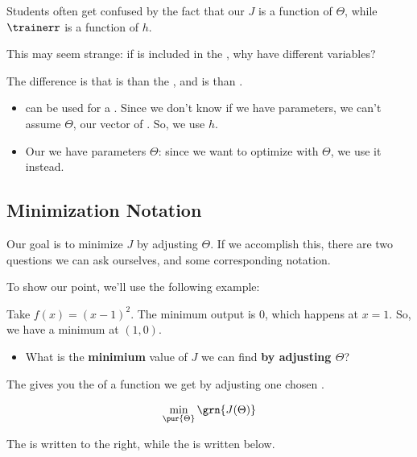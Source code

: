         \begin{clarification}
           Students often get confused by the fact that our  $J$ is a function of $\Theta$, while  $\trainerr$ is a function of $h$.
            
            This may seem strange: if  is included in the , why have different variables?
            
            The difference is that  is  than the , and  is  than \purp{$\Theta$}.
            
            \begin{itemize}
                \item {} can be used for a . Since we don't know if we have parameters, we can't assume $\Theta$, our vector of . So, we use $h$.
                
                \item Our   we have parameters $\Theta$: since we want to optimize with $\Theta$, we use it instead.
            \end{itemize}
            
        \end{clarification}
        
    \subsection{Minimization Notation}
        
        Our goal is to minimize $J$ by adjusting $\Theta$. If we accomplish this, there are two questions we can ask ourselves, and some corresponding notation.
        
        To show our point, we'll use the following example:
        
        \miniex Take $f(x)=(x-1)^2$. The minimum output is 0, which happens at $x=1$. So, we have a minimum at $(1, 0)$.
        
        \begin{itemize}
            \item What is the \textbf{minimium} value of $J$ we can find \textbf{by adjusting $\Theta$}?
        \end{itemize}
        
        \begin{notation}
            The  gives you the  of a function we get by adjusting one chosen .
            
            \begin{equation*}
                \min_{ \pur{ \Theta } }{ \grn{ J(\Theta) } }
            \end{equation*}
            
            The  is written to the right, while the  is written below.
        
        \end{notation}
        
